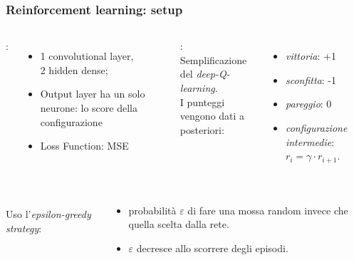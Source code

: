 \documentclass[handout]{beamer}
\begin{document}
  \begin{frame}
    \frametitle{Reinforcement learning: setup}
    \begin{columns}[t]
        :
        \begin{itemize}
          \item 1 convolutional layer,\\2 hidden dense;
          \item Output layer ha un solo neurone: lo score della configurazione
          \item Loss Function: MSE
        \end{itemize}
        \pause
        :\\
        Semplificazione del \emph{deep-Q-learning}.\\
         I punteggi vengono dati a posteriori:
        \begin{itemize}
          \item \emph{vittoria}: +1
          \item \emph{sconfitta}: -1
          \item \emph{pareggio}: 0
          \item \emph{configurazione intermedie}: \(r_i = \gamma \cdot r_{i+1}\).
        \end{itemize}
    \end{columns}
   
    \pause
    \begin{columns}[t]
      \column{\textwidth}
        \\
        Uso l'\emph{epsilon-greedy strategy}:
        \begin{itemize}
          \item probabilità \(\varepsilon\) di fare una mossa random invece che quella scelta dalla rete.
          \item \(\varepsilon\) decresce allo scorrere degli episodi. 
        \end{itemize}
    \end{columns}
    
  
  \end{frame}
\end{document}
